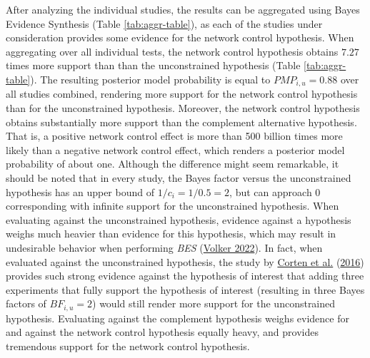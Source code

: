 \documentclass[
  11pt,
]{article}
\begin{document}
After analyzing the individual studies, the results can be aggregated using Bayes Evidence Synthesis (Table \ref{tab:aggr-table}), as each of the studies under consideration provides some evidence for the network control hypothesis.
When aggregating over all individual tests, the network control hypothesis obtains \(7.27\) times more support than than the unconstrained hypothesis (Table \ref{tab:aggr-table}).
The resulting posterior model probability is equal to \(PMP_{i,u} = 0.88\) over all studies combined, rendering more support for the network control hypothesis than for the unconstrained hypothesis.
Moreover, the network control hypothesis obtains substantially more support than the complement alternative hypothesis.
That is, a positive network control effect is more than 500 billion times more likely than a negative network control effect, which renders a posterior model probability of about one.
Although the difference might seem remarkable, it should be noted that in every study, the Bayes factor versus the unconstrained hypothesis has an upper bound of \(1/c_i = 1/0.5 = 2\), but can approach \(0\) corresponding with infinite support for the unconstrained hypothesis.
When evaluating against the unconstrained hypothesis, evidence against a hypothesis weighs much heavier than evidence for this hypothesis, which may result in undesirable behavior when performing \emph{BES} (\protect\hyperlink{ref-volker_bes_2022}{Volker 2022}).
In fact, when evaluated against the unconstrained hypothesis, the study by \protect\hyperlink{ref-corten_etal_reputation_2016}{Corten et al.} (\protect\hyperlink{ref-corten_etal_reputation_2016}{2016}) provides such strong evidence against the hypothesis of interest that adding three experiments that fully support the hypothesis of interest (resulting in three Bayes factors of \(BF_{i,u} = 2\)) would still render more support for the unconstrained hypothesis.
Evaluating against the complement hypothesis weighs evidence for and against the network control hypothesis equally heavy, and provides tremendous support for the network control hypothesis.
\end{document}

